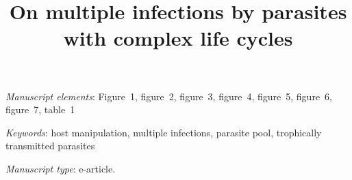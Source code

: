 \documentclass[11pt]{article}
\title{On multiple infections by parasites with complex life cycles}
\date{}
\begin{document}
\maketitle

%

\bigskip

\textit{Manuscript elements}:  Figure~1, figure~2, figure~3, figure~4, figure~5, figure~6, figure~7, table~1%

\bigskip

\textit{Keywords}: host manipulation, multiple infections, parasite pool, trophically transmitted parasites


\bigskip

\textit{Manuscript type}: e-article. %

\bigskip


\linenumbers{}

\newpage{}
\end{document}
